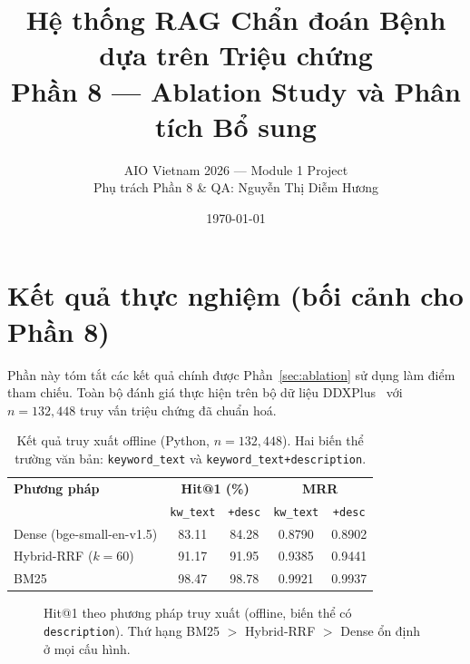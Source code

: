 \documentclass[11pt,a4paper]{article}
\title{Hệ thống RAG Chẩn đoán Bệnh dựa trên Triệu chứng\\
       \large Phần 8 --- Ablation Study và Phân tích Bổ sung}
\author{AIO Vietnam 2026 --- Module 1 Project\\
        \small Phụ trách Phần 8 \& QA: Nguyễn Thị Diễm Hương}
\date{\today}
\begin{document}
\maketitle

\section{Kết quả thực nghiệm (bối cảnh cho Phần 8)}
\label{sec:ketqua}

Phần này tóm tắt các kết quả chính được Phần~\ref{sec:ablation} sử dụng làm
điểm tham chiếu. Toàn bộ đánh giá thực hiện trên bộ dữ liệu
DDXPlus~\cite{ddxplus2022} với $n=132{,}448$ truy vấn triệu chứng đã chuẩn hoá.

\begin{table}[H]
\centering
\small
\caption{Kết quả truy xuất offline (Python, $n=132{,}448$). Hai biến thể trường
văn bản: \texttt{keyword\_text} và \texttt{keyword\_text+description}.}
\label{tab:offline}
\begin{tabular}{lcccc}
\hline
\textbf{Phương pháp} & \multicolumn{2}{c}{\textbf{Hit@1 (\%)}} &
\multicolumn{2}{c}{\textbf{MRR}}\\
 & \texttt{kw\_text} & \texttt{+desc} & \texttt{kw\_text} & \texttt{+desc}\\
\hline
Dense (bge-small-en-v1.5) & 83.11 & 84.28 & 0.8790 & 0.8902\\
Hybrid-RRF ($k=60$)       & 91.17 & 91.95 & 0.9385 & 0.9441\\
BM25                      & 98.47 & 98.78 & 0.9921 & 0.9937\\
\hline
\end{tabular}
\end{table}

\begin{figure}[H]
\centering
{}
\caption{Hit@1 theo phương pháp truy xuất (offline, biến thể có
\texttt{description}). Thứ hạng BM25 $>$ Hybrid-RRF $>$ Dense ổn định ở mọi cấu
hình.}
\label{fig:bar}
\end{figure}
\end{document}
